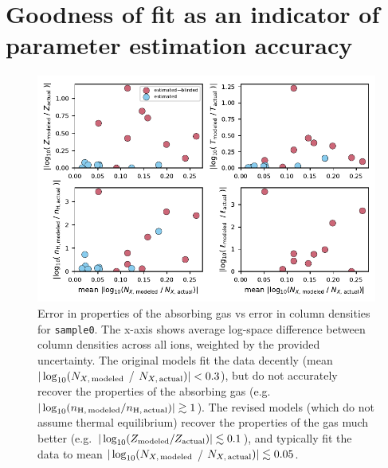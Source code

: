 \documentclass[fleqn,usenatbib]{mnras}
\begin{document}


\appendix

\section{Goodness of fit as an indicator of parameter estimation accuracy}
\label{a: error vs error}

\begin{figure}
    \centering
    \includegraphics[width=\textwidth]{figures/sample0/error_vs_error.pdf}
    \caption{
    Error in properties of the absorbing gas vs error in column densities for \texttt{sample0}.
    The x-axis shows average log-space difference between column densities across all ions, weighted by the provided uncertainty.
    The original models fit the data decently (mean $\vert \log_{10}( N_{X,\,{\rm modeled}}$ / $N_{X,\,{\rm actual}}) \vert < 0.3$), but do not accurately recover the properties of the absorbing gas (e.g. $\vert \log_{10}( n_{\rm H,\,modeled} / n_{\rm H,\,actual}) \vert \gtrsim 1$).
    The revised models (which do not assume thermal equilibrium) recover the properties of the gas much better (e.g. $\vert \log_{10}( Z_{\rm modeled} / Z_{\rm actual}) \vert \lesssim 0.1$), and typically fit the data to mean $\vert \log_{10}( N_{X,\,{\rm modeled}}$ / $N_{X,\,{\rm actual}}) \vert \lesssim 0.05$.
    }
    \label{f: error vs error}
\end{figure}
\end{document}
